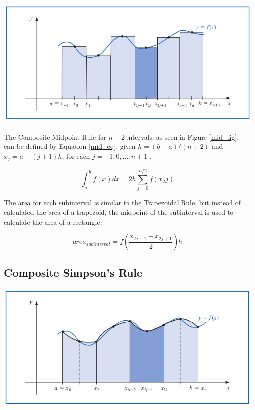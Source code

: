 \documentclass[a4paper]{article}
\begin{document}
\begin{center}
	\includegraphics[width=1\textwidth]{../additional/midpoint_fig.png}
	\label{mid_fig}
\end{center}

The Composite Midpoint Rule for $n+2$ intervals, as seen in Figure \ref{mid_fig}, can be defined by Equation \ref{mid_eq}, given $h=(b-a)/(n+2)$ and $x_j=a+(j+1)h$, for each $j=-1,0,\dots,n+1$ \citep{burden2010}.

\begin{equation}
\int_{a}^b f(x) dx = 2h \sum_{j=0}^{n/2}f(x_2j)
\label{mid_eq}
\end{equation}

The area for each subinterval is similar to the Trapezoidal Rule, but instead of calculated the area of a trapezoid, the midpoint of the subinterval is used to calculate the area of a rectangle:

\begin{equation}
area_{subinterval} = f(\frac{x_{2j-1}+x_{2j+1}}{2})h
\end{equation}

\subsection{Composite Simpson's Rule}\label{method:simpsons}

\begin{center}
	\includegraphics[width=1\textwidth]{../additional/simpsons_fig.png}
	\label{sim_fig}
\end{center}
\end{document}
